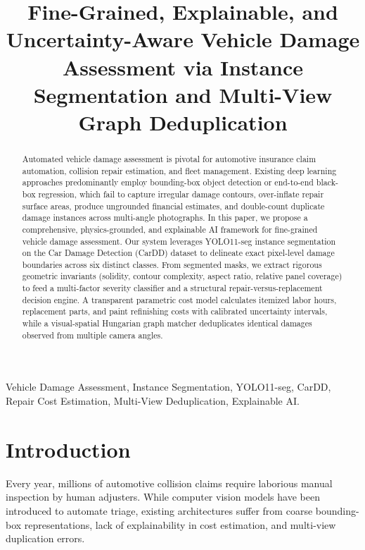 \documentclass[conference]{IEEEtran}
\begin{document}
\title{Fine-Grained, Explainable, and Uncertainty-Aware Vehicle Damage Assessment via Instance Segmentation and Multi-View Graph Deduplication}

\author{
}

\maketitle

\begin{abstract}
Automated vehicle damage assessment is pivotal for automotive insurance claim automation, collision repair estimation, and fleet management. Existing deep learning approaches predominantly employ bounding-box object detection or end-to-end black-box regression, which fail to capture irregular damage contours, over-inflate repair surface areas, produce ungrounded financial estimates, and double-count duplicate damage instances across multi-angle photographs. In this paper, we propose a comprehensive, physics-grounded, and explainable AI framework for fine-grained vehicle damage assessment. Our system leverages YOLO11-seg instance segmentation on the Car Damage Detection (CarDD) dataset to delineate exact pixel-level damage boundaries across six distinct classes. From segmented masks, we extract rigorous geometric invariants (solidity, contour complexity, aspect ratio, relative panel coverage) to feed a multi-factor severity classifier and a structural repair-versus-replacement decision engine. A transparent parametric cost model calculates itemized labor hours, replacement parts, and paint refinishing costs with calibrated uncertainty intervals, while a visual-spatial Hungarian graph matcher deduplicates identical damages observed from multiple camera angles.
\end{abstract}

\begin{IEEEkeywords}
Vehicle Damage Assessment, Instance Segmentation, YOLO11-seg, CarDD, Repair Cost Estimation, Multi-View Deduplication, Explainable AI.
\end{IEEEkeywords}

\section{Introduction}
Every year, millions of automotive collision claims require laborious manual inspection by human adjusters. While computer vision models have been introduced to automate triage, existing architectures suffer from coarse bounding-box representations, lack of explainability in cost estimation, and multi-view duplication errors.
\end{document}
